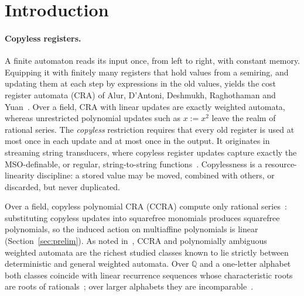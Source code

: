 \documentclass[acmlarge,screen,11pt,nonacm,natbib=false]{acmart}
\newcommand{\Q}{\mathbb{Q}}
\theoremstyle{definition}
\begin{document}
\begin{abstract}
Beyond the invertible sector, the witness for non-closure under reversal is $\sum_{i}\prod_{j<i}|u_j|$ over blocks $u_0\#u_1\#\cdots$: it is not CCRA-computable, while its reversal is. The obstruction is arithmetic: a compressed register must carry the inverse of a weight of the unipotent part, and translations must be rational as well. We characterize CCRA-computability exactly when all singular minimal letter matrices have rank at most one, and for one invertible letter with a rank-two reset such that every word containing the reset has rank two. A characterization for arbitrary singular series remains open.
\end{abstract}
\maketitle
\thispagestyle{plain}
\clearpage

\section{Introduction}
\paragraph{Copyless registers.}
A finite automaton reads its input once, from left to right, with constant memory. Equipping it with finitely many registers that hold values from a semiring, and updating them at each step by expressions in the old values, yields the cost register automata (CRA) of Alur, D'Antoni, Deshmukh, Raghothaman and Yuan~\cite{ADDRY13}. Over a field, CRA with linear updates are exactly weighted automata, whereas unrestricted polynomial updates such as $x:=x^2$ leave the realm of rational series. The \emph{copyless} restriction requires that every old register is used at most once in each update and at most once in the output. It originates in streaming string transducers, where copyless register updates capture exactly the MSO-definable, or regular, string-to-string functions~\cite{AC10,AC11}. Copylessness is a resource-linearity discipline: a stored value may be moved, combined with others, or discarded, but never duplicated.

Over a field, copyless polynomial CRA (CCRA) compute only rational series~\cite{MR16,MR19,MPS26}: substituting copyless updates into squarefree monomials produces squarefree polynomials, so the induced action on multiaffine polynomials is linear (Section~\ref{sec:prelim}). As noted in~\cite{MPS26}, CCRA and polynomially ambiguous weighted automata are the richest studied classes known to lie strictly between deterministic and general weighted automata. Over $\Q$ and a one-letter alphabet both classes coincide with linear recurrence sequences whose characteristic roots are roots of rationals~\cite{BFLM22}; over larger alphabets they are incomparable~\cite{MPS26}.
\end{document}
